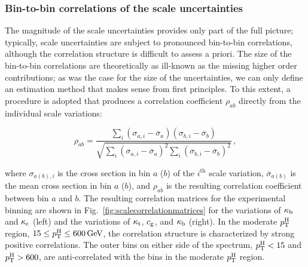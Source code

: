 \begin{table}[htb]
\centering
{}
\label{tab:scaleunc-ktcgkb}
\setlength{\tabcolsep}{2pt}
\begin{tabular}{lccccccccc}
\hline

\hline
\end{tabular}
\end{table}


\subsubsection{Bin-to-bin correlations of the scale uncertainties}

The magnitude of the scale uncertainties provides only part of the full picture; typically, scale uncertainties are subject to pronounced bin-to-bin correlations, although the correlation structure is difficult to assess a priori.
% 
The size of the bin-to-bin correlations are theoretically as ill-known as the missing higher order contributions; as was the case for the size of the uncertainties, we can only define an estimation method that makes sense from first principles.
% 
To this extent, a procedure is adopted that produces a correlation coefficient $\rho_{ab}$ directly from the individual scale variations:
% 
\begin{linenomath*}
\begin{equation}
\rho_{ab} = 
\frac{
    \sum_i ( \sigma_{a, i} - \overline{\sigma}_a ) ( \sigma_{b, i} - \overline{\sigma}_b )
    }{
    \sqrt{
        \sum_i ( \sigma_{a, i} - \overline{\sigma}_a )^2
        \sum_i ( \sigma_{b, i} - \overline{\sigma}_b )^2
        }
    }
    \,,
\end{equation}
\end{linenomath*}
% 
where $\sigma_{a (b), i}$ is the cross section in bin $a$ ($b$) of the $i^\text{th}$ scale variation, $\overline{\sigma}_{a (b)}$ is the mean cross section in bin $a$ ($b$), and $\rho_{ab}$ is the resulting correlation coefficient between bin $a$ and $b$.
% 
The resulting correlation matrices for the experimental binning are shown in Fig.~\ref{fig:scalecorrelationmatrices} for the variations of $\kappa_{\mathrm{b}}$ and $\kappa_{\mathrm{c}}$ (left) and the variations of $\kappa_{\mathrm{t}}$, $c_\mathrm{g}$, and $\kappa_{\mathrm{b}}$ (right).
% 
In the moderate $p_\mathrm{T}^\mathrm{H}$ region, $15 \leq p_\mathrm{T}^\mathrm{H} \leq 600\,\text{GeV}$, the correlation structure is characterized by strong positive correlations.
% 
The outer bins on either side of the spectrum, $p_\mathrm{T}^\mathrm{H}<15$ and $p_\mathrm{T}^\mathrm{H}>600$\GeV, are anti-correlated with the bins in the moderate $p_\mathrm{T}^\mathrm{H}$ region.

